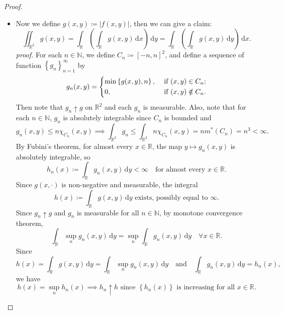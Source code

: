 \begin{proof}
    \hfill
    \begin{itemize}
        \item [a)] Now we define \(g(x, y) \coloneqq \vert f(x, y) \vert \), then we can give a claim:
        \[
            \iint _{\mathbb{R} ^2} g(x, y) = \int _{\mathbb{R} } \left( \int _{\mathbb{R} } g(x, y) \, \mathrm{d} x  \right) \, \mathrm{d} y = \int _{\mathbb{R} } \left( \int _{\mathbb{R} } g(x, y) \, \mathrm{d} y  \right) \, \mathrm{d} x.    
        \]
        \textit{proof.} For each \(n \in \mathbb{N}\), we define \(C_n \coloneqq [-n, n]^2\), and define a sequence of function \(\left\{ g_n \right\}_{n=1}^{\infty}  \) by 
        \[
            g_n(x, y) = \begin{dcases}
                \min \left\{ g(x, y), n \right\} , &\text{ if } (x, y) \in C_n ;\\
                0, &\text{ if } (x, y) \notin C_n.
            \end{dcases}
        \]   
        Then note that \(g_n \uparrow g\) on \(\mathbb{R} ^2\) and each \(g_n\) is measurable. Also, note that for each \(n \in \mathbb{N}\), \(g_n\) is absolutely integrable since \(C_n\) is bounded and
        \[
        g_n(x, y) \le n \chi_{C_n}(x, y) \implies \int_{\mathbb{R}
        ^2} g_n \le \int_{\mathbb{R}^2} n \chi_{C_n}(x, y) = n m^*(C_n) = n^3 < \infty.
        \]
        By Fubini's theorem, for almost every \(x \in \mathbb{R}\), the map \(y \mapsto g_n(x, y)\) is absolutely integrable, so
        \[
            h_n(x) \coloneqq \int _{\mathbb{R} } g_n(x, y) \, \mathrm{d} y < \infty \quad \text{for almost every } x \in \mathbb{R}.  
        \]        
        Since \(g(x, \cdot)\) is non-negative and measurable, the integral 
        \[
            h(x) \coloneqq \int _{\mathbb{R} } g(x, y) \, \mathrm{d} y \text{ exists, possibly equal to } \infty.  
        \] 
        Since \(g_n \uparrow g\) and \(g_n\) is measurable for all \(n \in \mathbb{N}\), by monotone convergence theorem,
        \[
            \int _{\mathbb{R} } \sup _n g_n(x, y) \, \mathrm{d} y = \sup _n \int _{\mathbb{R} } g_n(x, y) \, \mathrm{d} y \quad \forall x \in \mathbb{R}.  
        \]
        Since 
        \[
            h(x) = \int _{\mathbb{R} } g(x, y) \, \mathrm{d} y = \int _{\mathbb{R} } \sup _n g_n(x, y) \, \mathrm{d} y \quad \text{and} \quad \int _{\mathbb{R} } g_n(x, y) \, \mathrm{d} y = h_n(x),   
        \]
        we have 
        \[
            h(x) = \sup _n h_n(x) \implies h_n \uparrow h \text{ since } \left\{ h_n(x) \right\} \text{ is increasing for all } x \in \mathbb{R}.
\]
\end{itemize}
\end{proof}

